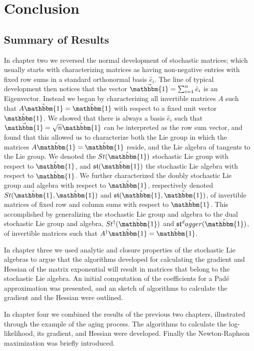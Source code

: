 \chapter{Conclusion}
\section{Summary of Results}
In chapter two we reversed the normal development of stochastic matrices; which usually
starts with characterizing matrices as having non-negative entries with fixed row sums in a
standard orthonormal basis $\hat{e}_i$. The line of typical development then notices that
the vector $\vec{\mathbbm{1}} = \sum_{i=1}^n \hat{e}_i$ is an Eigenvector. Instead we began
by characterizing all invertible matrices $A$ such that $A \hat{\mathbbm{1}} = \hat{\mathbbm{1}}$
with respect to a fixed unit vector $\hat{\mathbbm{1}}$. We showed that there is always a 
basis $\hat{e}_i$ such that $\vec{\mathbbm{1}} = \sqrt{n} \hat{\mathbbm{1}}$ can be
interpreted as the row sum vector, and found that this allowed us to characterize both the Lie 
group in which the matrices $A \hat{\mathbbm{1}} = \hat{\mathbbm{1}}$ reside, and the Lie
algebra of tangents to the Lie group. We denoted the $St(\hat{\mathbbm{1}})$ stochastic Lie
group with respect to $\hat{\mathbbm{1}}$, and $\mathfrak{st}(\hat{\mathbbm{1}})$ the
stochastic Lie algebra with respect to $\hat{\mathbbm{1}}$. We further characterized the
doubly stochastic Lie group and algebra with respect to $\hat{\mathbbm{1}}$, respectively 
denoted $St(\hat{\mathbbm{1}}, \hat{\mathbbm{1}})$ and $\mathfrak{st}(\hat{\mathbbm{1}}, \hat{\mathbbm{1}})$,
of invertible matrices of fixed row and column sums with respect to $\hat{\mathbbm{1}}$. 
This accomplished by generalizing the stochastic Lie group and algebra to the dual
stochastic Lie group and algebra, $St^\dagger(\hat{\mathbbm{1}})$ and $\mathfrak{st}^dagger(\hat{\mathbbm{1}})$, 
of invertible matrices such that $A^\dagger \hat{\mathbbm{1}} = \hat{\mathbbm{1}}$.

In chapter three we used analytic and closure properties of the stochastic Lie algebras to
argue that the algorithms developed for calculating the gradient and Hessian of the matrix
exponential will result in matrices that belong to the stochastic Lie algebra. An initial
computation of the coefficients for a Pad\'{e} approximation was presented, and an sketch
of algorithms to calculate the gradient and the Hessian were outlined.

In chapter four we combined the results of the previous two chapters, illustrated through
the example of the aging process. The algorithms to calculate the log-likelihood, its
gradient, and Hessian were developed. Finally the Newton-Raphson maximization was briefly
introduced.
